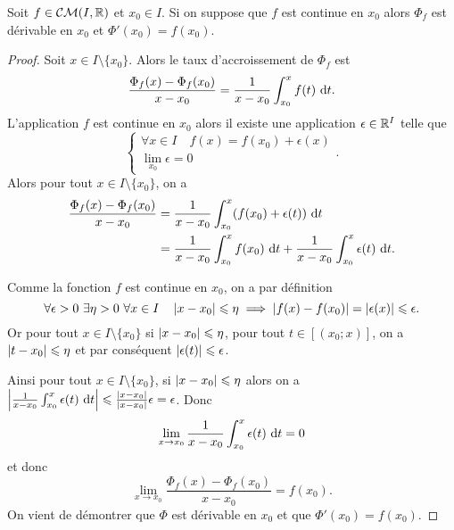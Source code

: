 \begin{prop}
  Soit \(f \in \mathcal{CM}(I,\mathbb{R})\) et \(x_0 \in I\). Si on suppose que \(f\) est
  continue en \(x_0\) alors \(\Phi_f\) est dérivable en \(x_0\) et
  \(\Phi'(x_0) = f(x_0)\).
\end{prop}
\begin{proof}
  Soit \(x \in I \setminus\{x_0\}\). Alors le taux d'accroissement de \(\Phi_f\)
  est
  \begin{equation}
    \frac{\Phi_f(x)-\Phi_f(x_0)}{x-x_0} = \frac{1}{x-x_0} \int_{x_0}^x
    f(t)\,\mathop{}\mathopen{}\mathrm{d} t.
  \end{equation}
  L'application \(f\) est continue en \(x_0\) alors il existe une application
  \(\epsilon \in \mathbb{R}^I\) telle que
  \begin{equation}
    \begin{cases} \forall x \in I \quad f(x) = f(x_0)+\epsilon(x) \\
    \lim\limits_{x_0} \epsilon =0 \end{cases}.
  \end{equation}
  Alors pour tout \(x \in I \setminus\{x_0\}\), on a
  \begin{align*}
    \frac{\Phi_f(x)-\Phi_f(x_0)}{x-x_0} &= \frac{1}{x-x_0} \int_{x_0}^x
    (f(x_0)+\epsilon(t))\,\mathop{}\mathopen{}\mathrm{d} t \\
    &=  \frac{1}{x-x_0} \int_{x_0}^x f(x_0)\,\mathop{}\mathopen{}\mathrm{d} t + \frac{1}{x-x_0}
    \int_{x_0}^x\epsilon(t)\,\mathop{}\mathopen{}\mathrm{d} t.
  \end{align*}

  Comme la fonction \(f\) est continue en \(x_0\), on a par définition
  \begin{equation}
    \forall \epsilon >0 \ \exists \eta>0 \ \forall x \in I \quad \left\lvert x-x_0\right\rvert
    \leqslant \eta \implies \left\lvert f(x)-f(x_0)\right\rvert = \left\lvert\epsilon(x)\right\rvert \leqslant
    \epsilon.
  \end{equation}
  Or pour tout \(x \in I \setminus\{x_0\}\) si \(\left\lvert x-x_0\right\rvert\leqslant \eta\),
  pour tout \(t \in [(x_0;x)]\), on a \(\left\lvert t-x_0\right\rvert \leqslant \eta\) et par
  conséquent \(\left\lvert\epsilon(t)\right\rvert\leqslant \epsilon\).

  Ainsi pour tout \(x \in I \setminus\{x_0\}\), si \(\left\lvert x-x_0\right\rvert\leqslant \eta\)
  alors on a \(\left\lvert\frac{1}{x-x_0} \int_{x_0}^x\epsilon(t)\,\mathop{}\mathopen{}\mathrm{d} t\right\rvert \leqslant
  \frac{\left\lvert x-x_0\right\rvert}{\left\lvert x-x_0\right\rvert}\epsilon = \epsilon\). Donc
  \begin{equation}
    \lim\limits_{x \to x_0} \frac{1}{x-x_0} \int_{x_0}^x\epsilon(t)\,\mathop{}\mathopen{}\mathrm{d} t = 0
  \end{equation}
  et donc
  \begin{equation}
    \lim\limits_{x \to x_0}\frac{\Phi_f(x)-\Phi_f(x_0)}{x-x_0} =f(x_0).
  \end{equation}
  On vient de démontrer que \(\Phi\) est dérivable en \(x_0\) et que
  \(\Phi'(x_0) = f(x_0)\).
\end{proof}

